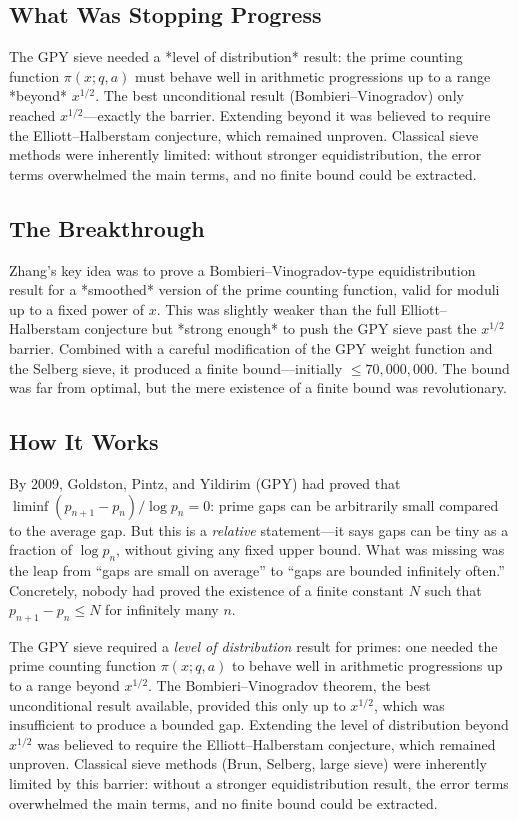\subsection{What Was Stopping Progress}
The GPY sieve needed a *level of distribution* result: the prime counting function $\pi(x; q, a)$ must behave well in arithmetic progressions up to a range *beyond* $x^{1/2}$. The best unconditional result (Bombieri--Vinogradov) only reached $x^{1/2}$---exactly the barrier. Extending beyond it was believed to require the Elliott--Halberstam conjecture, which remained unproven. Classical sieve methods were inherently limited: without stronger equidistribution, the error terms overwhelmed the main terms, and no finite bound could be extracted.

\subsection{The Breakthrough}
Zhang's key idea was to prove a Bombieri--Vinogradov-type equidistribution result for a *smoothed* version of the prime counting function, valid for moduli up to a fixed power of $x$. This was slightly weaker than the full Elliott--Halberstam conjecture but *strong enough* to push the GPY sieve past the $x^{1/2}$ barrier. Combined with a careful modification of the GPY weight function and the Selberg sieve, it produced a finite bound---initially $\leq 70{,}000{,}000$. The bound was far from optimal, but the mere existence of a finite bound was revolutionary.

\subsection{How It Works}

By 2009, Goldston, Pintz, and Yildirim (GPY) had proved that $\liminf (p_{n+1} - p_n)/\log p_n = 0$: prime gaps can be arbitrarily small compared to the average gap. But this is a \emph{relative} statement---it says gaps can be tiny as a fraction of $\log p_n$, without giving any fixed upper bound. What was missing was the leap from ``gaps are small on average'' to ``gaps are bounded infinitely often.'' Concretely, nobody had proved the existence of a finite constant $N$ such that $p_{n+1} - p_n \leq N$ for infinitely many $n$.

The GPY sieve required a \emph{level of distribution} result for primes: one needed the prime counting function $\pi(x; q, a)$ to behave well in arithmetic progressions up to a range beyond $x^{1/2}$. The Bombieri--Vinogradov theorem, the best unconditional result available, provided this only up to $x^{1/2}$, which was insufficient to produce a bounded gap. Extending the level of distribution beyond $x^{1/2}$ was believed to require the Elliott--Halberstam conjecture, which remained unproven. Classical sieve methods (Brun, Selberg, large sieve) were inherently limited by this barrier: without a stronger equidistribution result, the error terms overwhelmed the main terms, and no finite bound could be extracted.


